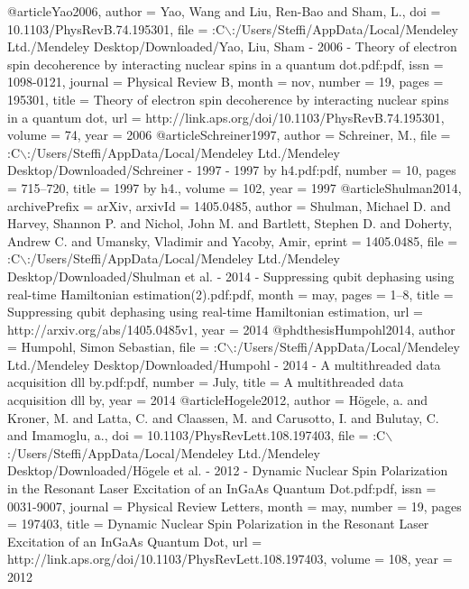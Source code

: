 @article{Yao2006,
author = {Yao, Wang and Liu, Ren-Bao and Sham, L.},
doi = {10.1103/PhysRevB.74.195301},
file = {:C$\backslash$:/Users/Steffi/AppData/Local/Mendeley Ltd./Mendeley Desktop/Downloaded/Yao, Liu, Sham - 2006 - Theory of electron spin decoherence by interacting nuclear spins in a quantum dot.pdf:pdf},
issn = {1098-0121},
journal = {Physical Review B},
month = {nov},
number = {19},
pages = {195301},
title = {{Theory of electron spin decoherence by interacting nuclear spins in a quantum dot}},
url = {http://link.aps.org/doi/10.1103/PhysRevB.74.195301},
volume = {74},
year = {2006}
}
@article{Schreiner1997,
author = {Schreiner, M.},
file = {:C$\backslash$:/Users/Steffi/AppData/Local/Mendeley Ltd./Mendeley Desktop/Downloaded/Schreiner - 1997 - 1997 by h4.pdf:pdf},
number = {10},
pages = {715--720},
title = {1997 by h4.},
volume = {102},
year = {1997}
}
@article{Shulman2014,
archivePrefix = {arXiv},
arxivId = {1405.0485},
author = {Shulman, Michael D. and Harvey, Shannon P. and Nichol, John M. and Bartlett, Stephen D. and Doherty, Andrew C. and Umansky, Vladimir and Yacoby, Amir},
eprint = {1405.0485},
file = {:C$\backslash$:/Users/Steffi/AppData/Local/Mendeley Ltd./Mendeley Desktop/Downloaded/Shulman et al. - 2014 - Suppressing qubit dephasing using real-time Hamiltonian estimation(2).pdf:pdf},
month = {may},
pages = {1--8},
title = {{Suppressing qubit dephasing using real-time Hamiltonian estimation}},
url = {http://arxiv.org/abs/1405.0485v1},
year = {2014}
}
@phdthesis{Humpohl2014,
author = {Humpohl, Simon Sebastian},
file = {:C$\backslash$:/Users/Steffi/AppData/Local/Mendeley Ltd./Mendeley Desktop/Downloaded/Humpohl - 2014 - A multithreaded data acquisition dll by.pdf:pdf},
number = {July},
title = {{A multithreaded data acquisition dll by}},
year = {2014}
}
@article{Hogele2012,
author = {H{\"{o}}gele, a. and Kroner, M. and Latta, C. and Claassen, M. and Carusotto, I. and Bulutay, C. and Imamoglu, a.},
doi = {10.1103/PhysRevLett.108.197403},
file = {:C$\backslash$:/Users/Steffi/AppData/Local/Mendeley Ltd./Mendeley Desktop/Downloaded/H{\"{o}}gele et al. - 2012 - Dynamic Nuclear Spin Polarization in the Resonant Laser Excitation of an InGaAs Quantum Dot.pdf:pdf},
issn = {0031-9007},
journal = {Physical Review Letters},
month = {may},
number = {19},
pages = {197403},
title = {{Dynamic Nuclear Spin Polarization in the Resonant Laser Excitation of an InGaAs Quantum Dot}},
url = {http://link.aps.org/doi/10.1103/PhysRevLett.108.197403},
volume = {108},
year = {2012}
}
